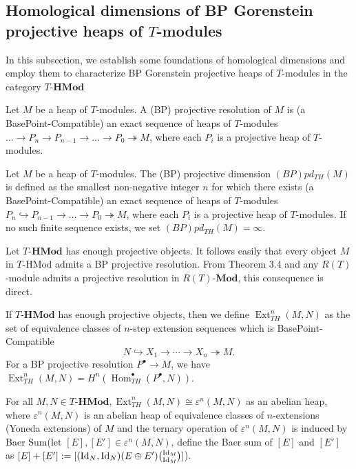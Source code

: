 \documentclass[11pt, twoside]{article}
\begin{document}
\subsection{Homological dimensions of BP Gorenstein projective heaps of $T$-modules}

In this subsection, we establish some foundations of homological dimensions and employ them to characterize BP Gorenstein projective heaps of $T$-modules in the category $T\textbf{-HMod}$

\begin{definition}
Let $M$ be a heap of $T$-modules. A (BP) projective resolution of $M$ is (a BasePoint-Compatible) an exact sequence of heaps of $T$-modules
$\dots \to P_n \to P_{n-1} \to \dots \to P_0 \twoheadrightarrow M $, where each $P_i$ is a projective heap of $T$-modules.
\end{definition}

\begin{definition}
Let $M$ be a heap of $T$-modules. The (BP) projective dimension $(BP)pd_{TH}(M)$ is defined as the smallest non-negative integer $n$ for which there exists (a BasePoint-Compatible) an exact sequence of heaps of $T$-modules $P_n \hookrightarrow P_{n-1} \to \dots \to P_0 \twoheadrightarrow M$, where each $P_i$ is a projective heap of $T$-modules. If no such finite sequence exists, we set $(BP)pd_{TH}(M) = \infty$.
\end{definition}

\begin{remark}
Let $T\textbf{-HMod}$ has enough projective objects. It follows easily that every object $M$ in $T\text{-HMod}$ admits a BP projective resolution. From Theorem 3.4 and any $R(T)$-module admits a projective resolution in $R(T)\textbf{-Mod}$, this consequence is direct.
\end{remark}

\begin{definition}
If $T\textbf{-HMod}$ has enough projective objects, then we define $\operatorname{Ext}_{TH}^n(M,N)$ as the set of equivalence classes of $n$-step extension sequences which is BasePoint-Compatible
$$ N \hookrightarrow X_1 \rightarrow \cdots \rightarrow X_n \twoheadrightarrow M.$$
For a BP projective resolution $P^\bullet \to M$, we have $\operatorname{Ext}_{TH}^n(M, N) = H^n(\operatorname{Hom}^\bullet_{TH}(P^\bullet, N))$.
\end{definition}
For all $M,N \in T\textbf{-HMod}, \operatorname{Ext}_{TH}^n(M,N) \cong \varepsilon^n(M,N)$ as an abelian heap, where $\varepsilon^n(M,N)$ is an abelian heap of equivalence classes of $n$-extensions (Yoneda extensions) of $M$ and the ternary operation of $\varepsilon^n(M,N)$ is induced by Baer Sum(let $[E], [E'] \in \varepsilon^n(M,N)$, define the Baer sum of $[E]$ and $[E']$ as $[E]+[E']:= [({\rm Id}_N,{\rm Id}_N)(E \oplus E')\binom{{\rm Id}_M}{{\rm Id}_M}]$).
\end{document}
